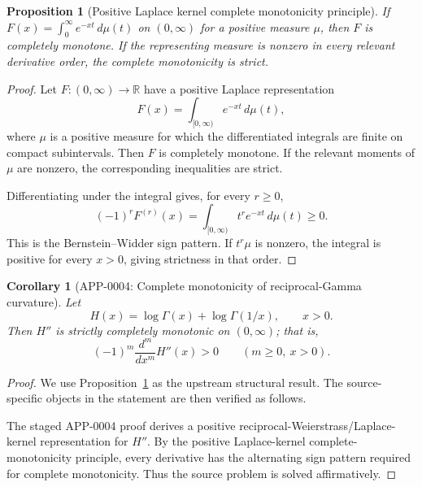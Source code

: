 \documentclass[11pt]{article}
\numberwithin{equation}{section}
\newtheorem{proposition}[theorem]{Proposition}
\newtheorem{corollary}[theorem]{Corollary}
\theoremstyle{definition}
\theoremstyle{remark}
\newcommand{\1}{\mathbf 1}
\begin{document}
\begin{proposition}[Positive Laplace kernel complete monotonicity principle]
\label{res:positive-laplace-kernel-complete-monotonicity-principle}
If \(F(x)=\int_0^\infty e^{-xt}\,d\mu(t)\) on \((0,\infty)\) for a positive measure \(\mu\), then \(F\) is completely monotone. If the representing measure is nonzero in every relevant derivative order, the complete monotonicity is strict.
\end{proposition}

\begin{proof}
Let \(F:(0,\infty)\to\mathbb R\) have a positive Laplace representation
\[
F(x)=\int_{[0,\infty)}e^{-xt}\,d\mu(t),
\]
where \(\mu\) is a positive measure for which the differentiated integrals are finite on compact subintervals. Then \(F\) is completely monotone. If the relevant moments of \(\mu\) are nonzero, the corresponding inequalities are strict.

Differentiating under the integral gives, for every \(r\ge0\),
\[
(-1)^rF^{(r)}(x)=\int_{[0,\infty)}t^r e^{-xt}\,d\mu(t)\ge0.
\]
This is the Bernstein--Widder sign pattern. If \(t^r\mu\) is nonzero, the integral is positive for every \(x>0\), giving strictness in that order.
\end{proof}

\begin{corollary}[APP-0004: Complete monotonicity of reciprocal-Gamma curvature]
\label{thm:reciprocal-gamma-complete-monotonicity}
Let
\begin{equation}
\label{eq:reciprocal-gamma-h}
H(x)=\log\Gamma(x)+\log\Gamma(1/x),\qquad x>0.
\end{equation}
Then \(H''\) is strictly completely monotonic on \((0,\infty)\); that is,
\begin{equation}
\label{eq:reciprocal-gamma-complete-monotonicity}
(-1)^m\frac{d^m}{dx^m}H''(x)>0
\qquad(m\ge0,\ x>0).
\end{equation}


\end{corollary}

\begin{proof}
We use Proposition~\ref{res:positive-laplace-kernel-complete-monotonicity-principle} as the upstream structural result. The source-specific objects in the statement are then verified as follows.

The staged APP-0004 proof derives a positive reciprocal-Weierstrass/Laplace-kernel representation for \(H''\). By the positive Laplace-kernel complete-monotonicity principle, every derivative has the alternating sign pattern required for complete monotonicity. Thus the source problem is solved affirmatively.
\end{proof}
\end{document}
